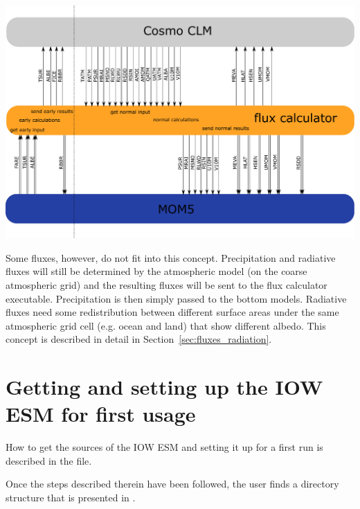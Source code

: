 \documentclass[a4paper,titlepage]{scrartcl}
\begin{document}
\begin{center}
\includegraphics[scale=0.3]{./sequence-diagram.pdf}
\end{center}

Some fluxes, however, do not fit into this concept. Precipitation and radiative fluxes will still be determined by the atmospheric model (on the coarse atmospheric grid) and the resulting fluxes will be sent to the flux calculator executable. Precipitation is then simply passed to the bottom models. Radiative fluxes need some redistribution between different surface areas under the same atmospheric grid cell (e.g. ocean and land) that show different albedo. This concept is described in detail in Section~\ref{sec:fluxes_radiation}.


\newpage
\section{Getting and setting up the IOW ESM for first usage}

How to get the sources of the IOW ESM and setting it up for a first run is described in the \Readme file.

Once the steps described therein have been followed, the user finds a directory structure that is presented in . 


\end{document}
